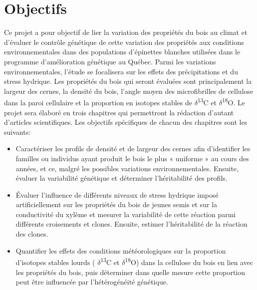 \documentclass[a4paper,12pt]{report}
\newcommand{\Ctreize}{$\delta$\textsuperscript{13}C\xspace}
\newcommand{\Odixhuit}{$\delta$\textsuperscript{18}O\xspace}
\begin{document}
\section{Objectifs}

Ce projet a pour objectif de lier la variation des propriétés du bois au climat et d'évaluer le contrôle génétique de cette variation des propriétés aux conditions environnementales dans des populations d'épinettes blanches utilisées dans le programme d'amélioration génétique au Québec. Parmi les variations environnementales, l'étude se focalisera sur les effets des précipitations et du stress hydrique. Les propriétés du bois qui seront évaluées sont principalement la largeur des cernes, la densité du bois, l'angle moyen des microfibrilles de cellulose dans la paroi cellulaire et la proportion en isotopes stables de \Ctreize et \Odixhuit. Le projet sera élaboré en trois chapitres qui permettront la rédaction d'autant d'articles scientifiques. Les objectifs spécifiques de chacun des chapitres sont les suivants:\\

\begin{itemize} 
	
	\item Caractériser les profils de densité et de largeur des cernes afin d'identifier les familles ou individus ayant produit le bois le plus « uniforme » au cours des années, et ce, malgré les possibles variations environnementales. Ensuite, évaluer la variabilité génétique et déterminer l'héritabilité des profils.
	
	\item Évaluer l'influence de différents niveaux de stress hydrique imposé artificiellement sur les propriétés du bois de jeunes semis et sur la conductivité du xylème et mesurer la variabilité de cette réaction parmi différents croisements et clones. Ensuite, estimer l'héritabilité de la réaction des clones.
	
	\item Quantifier les effets des conditions météorologiques sur la proportion d'isotopes stables lourds ( \Ctreize et \Odixhuit) dans la cellulose du bois en lien avec les propriétés du bois, puis déterminer dans quelle mesure cette proportion peut être influencée par l'hétérogénéité génétique.
	

	
\end{itemize}
\end{document}
